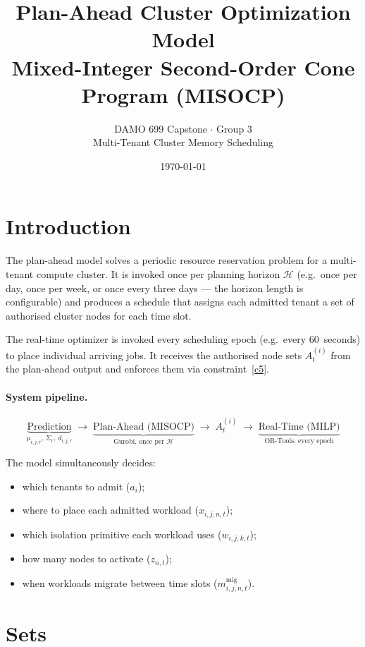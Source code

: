 \documentclass[11pt,a4paper]{article}
\title{\textbf{Plan-Ahead Cluster Optimization Model}\\[0.4em]
  \large Mixed-Integer Second-Order Cone Program (MISOCP)}
\author{DAMO 699 Capstone $\cdot$ Group 3\\
        Multi-Tenant Cluster Memory Scheduling}
\date{\today}
\newcommand{\cH}{\mathcal{H}}           %
\begin{document}
\maketitle
\tableofcontents
\newpage

\section{Introduction}

The plan-ahead model solves a periodic resource reservation problem for a
multi-tenant compute cluster.  It is invoked once per planning horizon
$\cH$ (e.g.\ once per day, once per week, or once every three days --- the
horizon length is configurable) and produces a schedule that assigns each
admitted tenant a set of authorised cluster nodes for each time slot.

The real-time optimizer is invoked every scheduling epoch (e.g.\ every
60~seconds) to place individual arriving jobs.  It receives the authorised
node sets $A_t^{(i)}$ from the plan-ahead output and enforces them via
constraint~\ref{c5}.

\paragraph{System pipeline.}
\[
  \underbrace{\text{Prediction}}_{\mu_{i,j,r},\,\Sigma_r,\,d_{i,j,r}}
  \;\longrightarrow\;
  \underbrace{\text{Plan-Ahead (MISOCP)}}_{\text{Gurobi, once per }\cH}
  \;\longrightarrow\;
  A_t^{(i)}
  \;\longrightarrow\;
  \underbrace{\text{Real-Time (MILP)}}_{\text{OR-Tools, every epoch}}
\]

The model simultaneously decides:
\begin{itemize}[nosep]
  \item which tenants to admit ($a_i$);
  \item where to place each admitted workload ($x_{i,j,n,t}$);
  \item which isolation primitive each workload uses ($w_{i,j,k,t}$);
  \item how many nodes to activate ($z_{n,t}$);
  \item when workloads migrate between time slots ($m_{i,j,n,t}^{\text{mig}}$).
\end{itemize}

\section{Sets}
\end{document}

